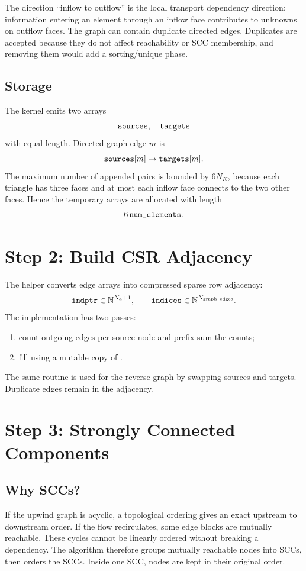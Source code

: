 \documentclass[11pt]{article}
\newcommand{\code}[1]{\texttt{\detokenize{#1}}}
\begin{document}
The direction ``inflow to outflow'' is the local transport dependency direction:
information entering an element through an inflow face contributes to unknowns
on outflow faces.  The graph can contain duplicate directed edges.  Duplicates
are accepted because they do not affect reachability or SCC membership, and
removing them would add a sorting/unique phase.

\subsection{Storage}

The kernel emits two arrays
\[
  \code{sources},\quad \code{targets}
\]
with equal length.  Directed graph edge \(m\) is
\[
  \code{sources}[m]\rightarrow \code{targets}[m].
\]
The maximum number of appended pairs is bounded by \(6N_K\), because each
triangle has three faces and at most each inflow face connects to the two other
faces.  Hence the temporary arrays are allocated with length
\[
  6\,\code{num_elements}.
\]

\section{Step 2: Build CSR Adjacency}

The helper \code{_build_csr_kernel} converts edge arrays into compressed sparse
row adjacency:
\[
  \code{indptr}\in\mathbb{N}^{N_a+1}, \qquad
  \code{indices}\in\mathbb{N}^{N_{\rm graph\ edges}}.
\]
The implementation has two passes:
\begin{enumerate}[nosep]
  \item count outgoing edges per source node and prefix-sum the counts;
  \item fill \code{indices} using a mutable copy of \code{indptr}.
\end{enumerate}
The same routine is used for the reverse graph by swapping sources and
targets.  Duplicate edges remain in the adjacency.

\section{Step 3: Strongly Connected Components}

\subsection{Why SCCs?}

If the upwind graph is acyclic, a topological ordering gives an exact upstream
to downstream order.  If the flow recirculates, some edge blocks are mutually
reachable.  These cycles cannot be linearly ordered without breaking a
dependency.  The algorithm therefore groups mutually reachable nodes into SCCs,
then orders the SCCs.  Inside one SCC, nodes are kept in their original order.
\end{document}
